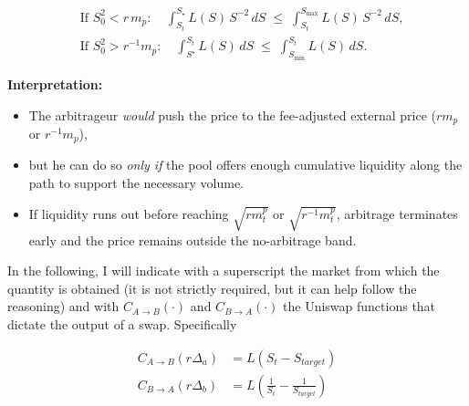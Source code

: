 \documentclass[a4paper,11pt]{article}
\begin{document}
\begin{equation}
\boxed{
\begin{aligned}
&\text{If } S^2_0 < r\,m_p:\quad
  \int_{S_t}^{S_\star} \! L(S)\,S^{-2} \, dS
  \;\le\;
  \int_{S_t}^{S_{\max}} \! L(S)\,S^{-2} \, dS, \\[10pt]
&\text{If } S^2_0 > r^{-1} m_p:\quad
  \int_{S^\star}^{S_t} \! L(S)\, dS
  \;\le\;
  \int_{S_{\min}}^{S_t} \! L(S)\, dS.
\end{aligned}
}
\end{equation}

\textbf{Interpretation:}
\begin{itemize}
  \item The arbitrageur \emph{would} push the price to the fee-adjusted external price ($r m_p$ or $r^{-1} m_p$),
  \item but he can do so \emph{only if} the pool offers enough cumulative liquidity along the path to support the necessary volume.
  \item If liquidity runs out before reaching $\sqrt{r m_t^p}$ or $\sqrt{r^{-1} m_t^p}$, arbitrage terminates early and the price remains outside the no-arbitrage band.
\end{itemize}

In the following, I will indicate with a superscript the market from which the quantity is obtained (it is not strictly required, but it can help follow the reasoning) and with $C_{A\to B}(\cdot)$ and $C_{B\to A}(\cdot)$ the Uniswap functions that dictate the output of a swap. Specifically

\begin{align}
C_{A\to B}(r\Delta_a) &= L(S_t -S_{target})
\nonumber
\\ 
C_{B\to A}(r\Delta_b) &= L\left(\frac{1}{S_t}-\frac{1}{S_{target}}\right)
\nonumber
\end{align}
\end{document}
